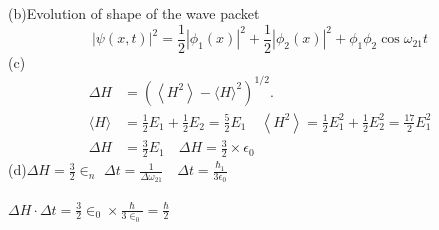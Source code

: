 \begin{enumerate}
\begin{answer}
	(b)Evolution of shape of the wave packet
	$$
	|\psi(x, t)|^{2}=\frac{1}{2}\left|\phi_{1}(x)\right|^{2}+\frac{1}{2}\left|\phi_{2}(x)\right|^{2}+\phi_{1} \phi_{2} \cos \omega_{21} t
	$$
	(c)\begin{align*}
		\Delta H &=\left(\left\langle H^{2}\right\rangle-\langle H\rangle^{2}\right)^{1 / 2} . \\
		\langle H\rangle &=\frac{1}{2} E_{1}+\frac{1}{2} E_{2}=\frac{5}{2} E_{1} \quad\left\langle H^{2}\right\rangle=\frac{1}{2} E_{1}^{2}+\frac{1}{2} E_{2}^{2}=\frac{17}{2} E_{1}^{2} \\
		\Delta H &=\frac{3}{2} E_{1} \quad \Delta H=\frac{3}{2} \times \epsilon_{0}
	\end{align*}
	(d)$\Delta H=\frac{3}{2} \in_{n}$
	$\Delta t=\frac{1}{\Delta \omega_{21}} \quad \Delta t=\frac{\hbar_{1}}{3 \epsilon_{0}}$\\\\
	$
	\Delta H \cdot \Delta t=\frac{3}{2} \in_{0} \times \frac{\hbar}{3 \in_{0}}=\frac{\hbar}{2}
	$
\end{answer}
\end{enumerate}
